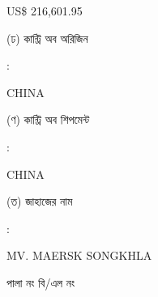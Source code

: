 \documentclass[12pt]{article}
\newcommand{\co}{CHINA}
\newcommand{\coship}{CHINA}
\newcommand{\vessel}{MV. MAERSK SONGKHLA}
\newcommand{\price}{US\$ 216,601.95}
\begin{document}
\begin{minipage}[t]{0.50\linewidth}
{\price}
\\
\end{minipage}
\begin{minipage}[t]{0.05\linewidth}
\hspace*{1em}
\end{minipage}
\begin{minipage}[t]{0.45\linewidth}
(ঢ) কান্ট্রি অব অরিজিন
\end{minipage}
\begin{minipage}[t]{0.02\linewidth}
:
\end{minipage}
\begin{minipage}[t]{0.50\linewidth}
{\co}
\\
\end{minipage}
\begin{minipage}[t]{0.05\linewidth}
\hspace*{1em}
\end{minipage}
\begin{minipage}[t]{0.45\linewidth}
(ণ) কান্ট্রি অব শিপমেন্ট
\end{minipage}
\begin{minipage}[t]{0.02\linewidth}
:
\end{minipage}
\begin{minipage}[t]{0.50\linewidth}
{\coship}
\\
\end{minipage}
\begin{minipage}[t]{0.05\linewidth}
\hspace*{1em}
\end{minipage}
\begin{minipage}[t]{0.45\linewidth}
(ত) জাহাজের নাম
\end{minipage}
\begin{minipage}[t]{0.02\linewidth}
:
\end{minipage}
\begin{minipage}[t]{0.50\linewidth}
{\vessel}
\end{minipage}
\begin{minipage}[t]{0.05\linewidth}
\hspace*{1em}
\end{minipage}
\begin{minipage}[t]{0.45\linewidth}
\hspace*{1.8em}পালা নং বি/এল নং
\end{minipage}
\begin{minipage}[t]{0.02\linewidth}
\hspace{1em}
\end{minipage}
\end{document}
